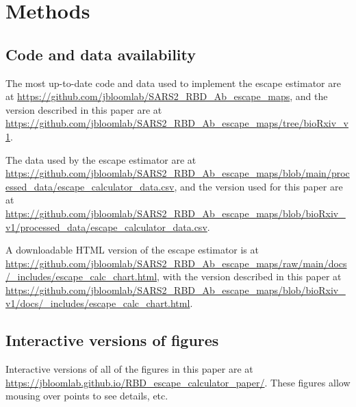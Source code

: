 \documentclass[9pt,twocolumn,twoside]{gsajnl_modified}
\begin{document}
{\small

\section{Methods}
\subsection{Code and data availability}
The most up-to-date code and data used to implement the escape estimator are at \url{https://github.com/jbloomlab/SARS2_RBD_Ab_escape_maps}, and the version described in this paper are at \url{https://github.com/jbloomlab/SARS2_RBD_Ab_escape_maps/tree/bioRxiv_v1}.

The data used by the escape estimator are at \url{https://github.com/jbloomlab/SARS2_RBD_Ab_escape_maps/blob/main/processed_data/escape_calculator_data.csv}, and the version used for this paper are at \url{https://github.com/jbloomlab/SARS2_RBD_Ab_escape_maps/blob/bioRxiv_v1/processed_data/escape_calculator_data.csv}.

A downloadable HTML version of the escape estimator is at \url{https://github.com/jbloomlab/SARS2_RBD_Ab_escape_maps/raw/main/docs/_includes/escape_calc_chart.html}, with the version described in this paper at \url{https://github.com/jbloomlab/SARS2_RBD_Ab_escape_maps/blob/bioRxiv_v1/docs/_includes/escape_calc_chart.html}.

\subsection{Interactive versions of figures}
Interactive versions of all of the figures in this paper are at \url{https://jbloomlab.github.io/RBD_escape_calculator_paper/}.
These figures allow mousing over points to see details, etc.

}
\end{document}
